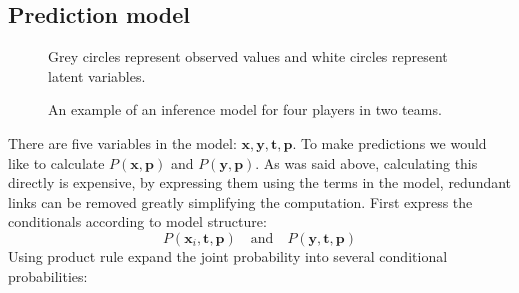 \documentclass[12pt,a4paper]{book}
\newcommand\bs[1]{\boldsymbol{#1}}
\newcommand\note[1]{\vspace*{-0.5\baselineskip}\caption*{#1}}
\begin{document}
\subsection{Prediction model}
\begin{figure}[ht]
\centering
{}
\caption{An example of an inference model for four players in two teams.}
\note{Grey circles represent observed values and white circles represent latent variables.}
\label{fig:four-player-model}
\end{figure}
There are five variables in the model: $\bs{x},\bs{y},\bs{t},\bs{p}$.
To make predictions we would like to calculate $P(\bs{x},\bs{p})$ and $P(\bs{y},\bs{p})$.
As was said above, calculating this directly is expensive, by expressing them using the terms in the model, redundant links can be removed greatly simplifying the computation.
First express the conditionals according to model structure:
\begin{equation}
P(\bs{x}_i,\bs{t},\bs{p})\quad \text{and} \quad P(\bs{y},\bs{t},\bs{p})
\end{equation}
Using product rule expand the joint probability into several conditional probabilities:
\end{document}
